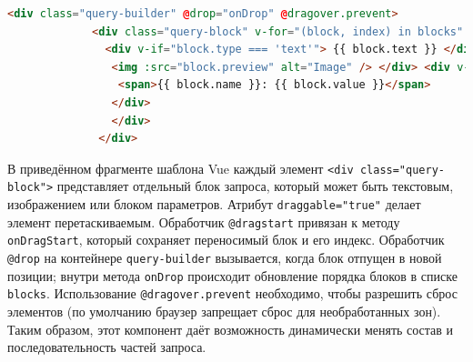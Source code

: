 \begin{lstlisting}[language=HTML]
       <div class="query-builder" @drop="onDrop" @dragover.prevent>
             <div class="query-block" v-for="(block, index) in blocks" :key="block.id" draggable="true" @dragstart="onDragStart(block, index)">
               <div v-if="block.type === 'text'"> {{ block.text }} </div> <div v-else-if="block.type === 'image'">
                <img :src="block.preview" alt="Image" /> </div> <div v-else-if="block.type === 'param'">
                 <span>{{ block.name }}: {{ block.value }}</span>
                </div>
                </div>
              </div>
\end{lstlisting}

\vspace{-0.5\baselineskip} 
В приведённом фрагменте шаблона Vue каждый элемент \verb|<div class="query-block">| представляет отдельный блок запроса, который может быть текстовым, изображением или блоком параметров. Атрибут \verb|draggable="true"| делает элемент перетаскиваемым. Обработчик \verb|@dragstart| привязан к методу \verb|onDragStart|, который сохраняет переносимый блок и его индекс. Обработчик \verb|@drop| на контейнере \verb|query-builder| вызывается, когда блок отпущен в новой позиции; внутри метода \verb|onDrop| происходит обновление порядка блоков в списке \verb|blocks|. Использование \verb|@dragover.prevent| необходимо, чтобы разрешить сброс элементов (по умолчанию браузер запрещает сброс для необработанных зон). Таким образом, этот компонент даёт возможность динамически менять состав и последовательность частей запроса.

